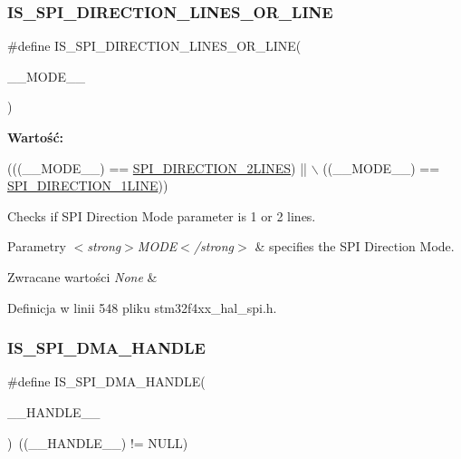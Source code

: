 \subsubsection{\texorpdfstring{I\+S\+\_\+\+S\+P\+I\+\_\+\+D\+I\+R\+E\+C\+T\+I\+O\+N\+\_\+L\+I\+N\+E\+S\+\_\+\+O\+R\+\_\+L\+I\+NE}{IS\_SPI\_DIRECTION\_2LINES\_OR\_1LINE}}
{\footnotesize\ttfamily \#define I\+S\+\_\+\+S\+P\+I\+\_\+\+D\+I\+R\+E\+C\+T\+I\+O\+N\+\_\+L\+I\+N\+E\+S\+\_\+\+O\+R\+\_\+L\+I\+NE(\begin{DoxyParamCaption}\item[{}]{\+\_\+\+\_\+\+M\+O\+D\+E\+\_\+\+\_\+ }\end{DoxyParamCaption})}

{\bfseries Wartość\+:}
\begin{DoxyCode}
(((\_\_MODE\_\_) == \hyperlink{group___s_p_i___direction_gaa7cb7f4bf4eebbf91bcfaeb17ebba7f3}{SPI\_DIRECTION\_2LINES}) || \(\backslash\)
                                                    ((\_\_MODE\_\_) == 
      \hyperlink{group___s_p_i___direction_gab0f684caf5f1d6ac1e73d90a4778ab93}{SPI\_DIRECTION\_1LINE}))
\end{DoxyCode}


Checks if S\+PI Direction Mode parameter is 1 or 2 lines. 


\begin{DoxyParams}{Parametry}
{\em $<$strong$>$\+M\+O\+D\+E$<$/strong$>$} & specifies the S\+PI Direction Mode. \\
\hline
\end{DoxyParams}

\begin{DoxyRetVals}{Zwracane wartości}
{\em None} & \\
\hline
\end{DoxyRetVals}


Definicja w linii 548 pliku stm32f4xx\+\_\+hal\+\_\+spi.\+h.

\mbox{\label{group___s_p_i___private___macros_gae54950bcff11d9165b99957cf8746ae4}} 
\subsubsection{\texorpdfstring{I\+S\+\_\+\+S\+P\+I\+\_\+\+D\+M\+A\+\_\+\+H\+A\+N\+D\+LE}{IS\_SPI\_DMA\_HANDLE}}
{\footnotesize\ttfamily \#define I\+S\+\_\+\+S\+P\+I\+\_\+\+D\+M\+A\+\_\+\+H\+A\+N\+D\+LE(\begin{DoxyParamCaption}\item[{}]{\+\_\+\+\_\+\+H\+A\+N\+D\+L\+E\+\_\+\+\_\+ }\end{DoxyParamCaption})~((\+\_\+\+\_\+\+H\+A\+N\+D\+L\+E\+\_\+\+\_\+) != N\+U\+LL)}



